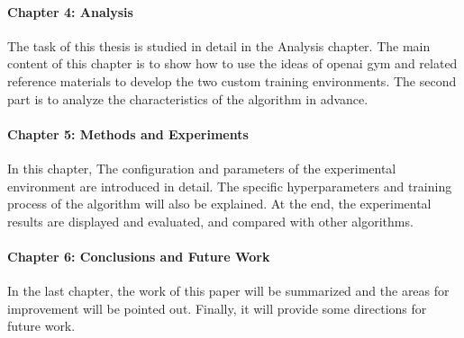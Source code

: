 \paragraph{Chapter 4: Analysis}
The task of this thesis is studied in detail in the Analysis chapter. The main content of this chapter is to show how to use the ideas of \gls{openai gym} and related reference materials to develop the two custom training environments. The second part is to analyze the characteristics of the algorithm in advance.

\paragraph{Chapter 5: Methods and Experiments}
In this chapter, The configuration and parameters of the experimental environment are introduced in detail. The specific hyperparameters and training process of the algorithm will also be explained. At the end, the experimental results are displayed and evaluated, and compared with other algorithms.

\paragraph{Chapter 6: Conclusions and Future Work}
In the last chapter, the work of this paper will be summarized and the areas for improvement will be pointed out. Finally, it will provide some directions for future work.